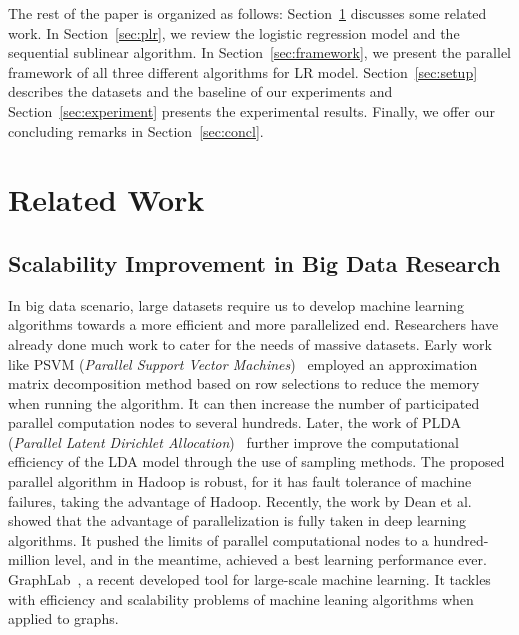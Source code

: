 \documentclass[10pt, conference, compsocconf]{IEEEtran}
\begin{document}
The rest of the paper is organized as follows:
Section~\ref{sec:rew} discusses some related work.
In Section~\ref{sec:plr}, we review the logistic regression model and the sequential sublinear algorithm.
In Section~\ref{sec:framework}, we present the parallel framework of all three different algorithms for LR model.
Section~\ref{sec:setup} describes the datasets and the baseline of our experiments and Section~\ref{sec:experiment} presents the experimental results.
Finally, we offer our concluding remarks in Section~\ref{sec:concl}.

\section{Related Work} \label{sec:rew}

\subsection{Scalability Improvement in Big Data Research}
In big data scenario, large datasets require us to develop machine learning algorithms towards a more efficient and more parallelized end.
Researchers have already done much work to cater for the needs of massive datasets.
Early work like PSVM (\textit{Parallel Support Vector Machines})~\cite{chang2011psvm} employed an approximation matrix decomposition method based on row selections to reduce the memory when running the algorithm.
It can then increase the number of participated parallel computation nodes to several hundreds.
Later, the work of PLDA (\textit{Parallel Latent Dirichlet Allocation})~\cite{wang2009plda} further improve the computational efficiency of the LDA model through the use of sampling methods.
The proposed parallel algorithm in Hadoop is robust, for it has fault tolerance of machine failures, taking the advantage of Hadoop.
Recently, the work by Dean et al.\cite{le2011building} showed that the advantage of parallelization is fully taken in deep learning algorithms.
It pushed the limits of parallel computational nodes to a hundred-million level, and in the meantime, achieved a best learning performance ever.
GraphLab~\cite{kyrola2012graphchi}, a recent developed tool for large-scale machine learning. It tackles with efficiency and scalability problems of machine leaning algorithms when applied to graphs.
\end{document}
